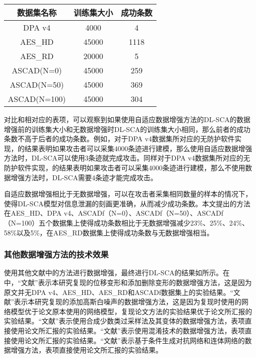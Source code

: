 {	\begin{table}[!h]
		\label{tab:originmtd}
		\centering
		\begin{tabular}{c|cc}
			\hline
			数据集名称&训练集大小&成功条数\\
			\hline
			DPA v4    &4000&4\\
			AES\_HD   &45000&1118\\
			AES\_RD   &20000&5\\
			ASCAD(N=0)&45000&259\\
			ASCAD(N=50)&45000&369\\
			ASCAD(N=100)&45000&304\\
			\hline
		\end{tabular}
	\end{table}

	对比和相对应的表项，可以观察到如果使用自适应数据增强方法的DL-SCA的数据增强前的训练集大小和无数据增强时DL-SCA的训练集大小相同，那么前者的成功条数不高于后者的成功条数。例如，对于DPA v4数据集所对应的无防护软件实现，的结果表明如果攻击者可以采集4000条迹进行建模，那么使用自适应数据增强方法时，DL-SCA可以使用3条迹就完成攻击。同样对于DPA v4数据集所对应的无防护软件实现，的结果表明如果攻击者可以采集4000条迹进行建模，那么不使用数据增强方法时，DL-SCA需要4条迹才能完成攻击。

	自适应数据增强相比于无数据增强，可以在攻击者采集相同数量的样本的情况下，使得DL-SCA模型对信息泄漏的刻画更准确，从而减少成功条数。本文提出的方法在AES\_HD、DPA v4、ASCADf（N=0）、ASCADf（N=50）、ASCADf（N=100）五个数据集上使得成功条数相比于无数据增强减少23\%、25\%、24\%、58\%以及5\%，在AES\_RD数据集上使得成功条数与无数据增强相当。
	\subsubsection{其他数据增强方法的技术效果}

	使用其他文献中的方法进行数据增强，最终进行DL-SCA的结果如所示。在中，“文献”表示本研究复现的\citet{Cagli17}位移变形和添加删除变形的数据增强方法，这是因为原文并无DPA v4、AES\_HD、AES\_RD和ASCADf数据集上的实验结果。“文献”表示本研究复现的\citet{Kim19}添加高斯白噪声的数据增强方法，这是因为复现时使用的网络模型优于论文原本使用的网络模型，复现论文方法的实验结果优于论文所汇报的实验结果。“文献”表示\citet{Won20}使用合成少数类过采样法及其变体的数据增强方法，表项直接使用论文所汇报的实验结果。“文献”表示\citet{Luo21}使用混淆技术的数据增强方法，表项直接使用论文所汇报的实验结果。“文献”表示\citet{Mukhtar22}基于条件生成对抗网络和连体网络的数据增强方法，表项直接使用论文所汇报的实验结果。

}
